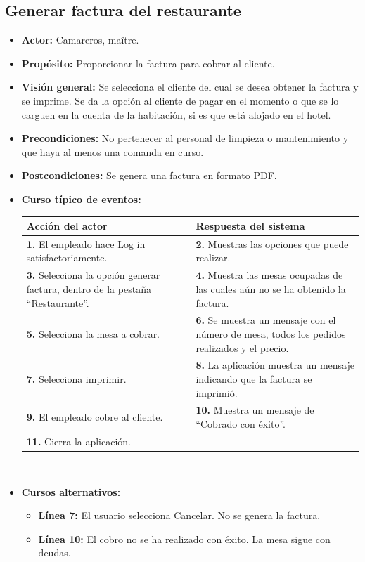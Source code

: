 \documentclass[spanish,a4paper,11pt, twoside]{report}	%
\begin{document}
		\subsection{Generar factura del restaurante}
			\begin{itemize}
			\item \textbf{Actor:} Camareros, maître.
			\item \textbf{Propósito: } Proporcionar la factura para cobrar al cliente.
			\item \textbf{Visión general:} Se selecciona el cliente del cual se desea obtener la factura y se imprime. Se da la opción al cliente de pagar en el momento o que se lo carguen en la cuenta de la habitación, si es que está alojado en el hotel.
			\item \textbf{Precondiciones:} No pertenecer al personal de limpieza o mantenimiento y que haya al menos una comanda en curso.
			\item \textbf{Postcondiciones:} Se genera una factura en formato PDF.
			\item \textbf{Curso típico de eventos:} 	\\
				\begin{tabular}{|p{6cm}||p{6cm}|}
				\hline
				\textbf{Acción del actor} & \textbf{Respuesta del sistema} \\ \hline \hline
				\textbf{1.}   El empleado hace Log in satisfactoriamente. & \textbf{2.} Muestras las opciones que puede realizar. \\ \hline
				\textbf{3.} Selecciona la opción generar factura, dentro de la pestaña “Restaurante''. & \textbf{4.} Muestra las mesas ocupadas de las cuales aún no se ha obtenido la factura. \\ \hline
				\textbf{5.} Selecciona la mesa a cobrar.	& \textbf{6.} Se muestra un mensaje con el número de mesa, todos los pedidos realizados y el precio. \\ \hline
				\textbf{7.} Selecciona imprimir.	& \textbf{8.} La aplicación muestra un mensaje indicando que la factura se imprimió. \\ \hline
				\textbf{9.} El empleado cobre al cliente.	& \textbf{10.} Muestra un mensaje de “Cobrado con éxito''. \\ \hline
				\textbf{11.} Cierra la aplicación. &  \\ \hline
			\end{tabular}
			\\
			\item \textbf{Cursos alternativos:} 
			\begin{itemize}
			\item  \textbf{Línea 7:} El usuario selecciona Cancelar. No se genera la factura.
			\item  \textbf{Línea 10:} El cobro no se ha realizado con éxito. La mesa sigue con deudas.
			\end {itemize}
		\end {itemize}
		
\end{document}
